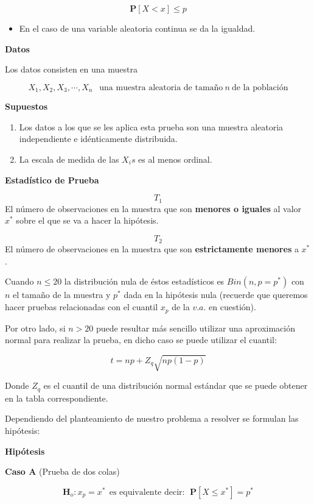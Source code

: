 \documentclass[
  a4paper,
  oneside,
  openany]{book}
\providecommand{\tightlist}{%
  \setlength{\itemsep}{0pt}\setlength{\parskip}{0pt}}
\begin{document}
\[ \mathbf{P}[X < x]\leq p\]

\begin{itemize}
\tightlist
\item
  En el caso de una variable aleatoria continua se da la igualdad.
\end{itemize}

\textbf{Datos}

Los datos consisten en una muestra

\[X_{1},X_{2},X_{3},\cdots,X_{n}  \  \ \mbox{ una muestra aleatoria de tamaño} \ n \  \mbox{de la población}\]

\textbf{Supuestos}

\begin{enumerate}
\def\labelenumi{\arabic{enumi})}
\item
  Los datos a los que se les aplica esta prueba son una muestra aleatoria independiente e idénticamente distribuida.
\item
  La escala de medida de las \(X_{i}s\) es al menos ordinal.
\end{enumerate}

\textbf{Estadístico de Prueba}

\[T_{1}\]
El número de observaciones en la muestra que son \textbf{menores o iguales} al valor \(x^*\) sobre el que se va a hacer la hipótesis.

\[T_{2}\]
El número de observaciones en la muestra que son \textbf{estrictamente menores} a \(x^*\).

Cuando \(n\leq 20\) la distribución nula de éstos estadísticos es \(Bin(n,p=p^*)\) con \(n\) el tamaño de la muestra y \(p^*\) dada en la hipótesis nula (recuerde que queremos hacer pruebas relacionadas con el cuantil \(x_{p}\) de la \(v.a.\) en cuestión).

Por otro lado, si \(n>20\) puede resultar más sencillo utilizar una aproximación normal para realizar la prueba, en dicho caso se puede utilizar el cuantil:

\[
t=np+Z_{q}\sqrt{np(1-p)}
\]

Donde \(Z_{q}\) es el cuantil de una distribución normal estándar que se puede obtener en la tabla correspondiente.

Dependiendo del planteamiento de nuestro problema a resolver se formulan las hipótesis:

\textbf{Hipótesis}

\textbf{Caso A} (Prueba de dos colas)

\[\textbf{H}_{o}: x_{p} = x^* \ \ \mbox{es equivalente  decir}: \ \ \mathbf{P}[X \leq x^*]= p^*\]
\end{document}
